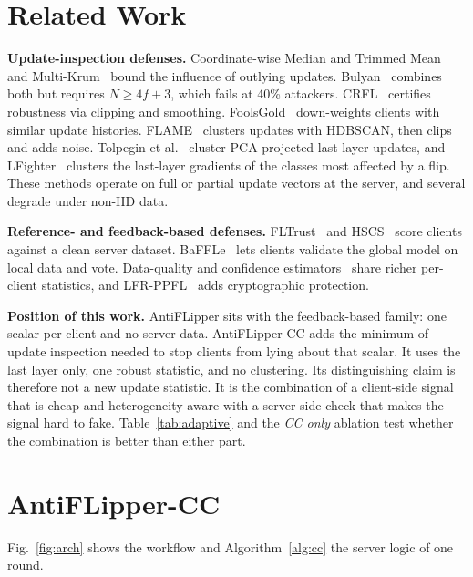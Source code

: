 \documentclass[conference]{IEEEtran}
\begin{document}
\section{Related Work}
\label{sec:related}
\textbf{Update-inspection defenses.} Coordinate-wise Median and Trimmed Mean~\cite{yin2018byzantine} and Multi-Krum~\cite{NIPS2017_f4b9ec30} bound the influence of outlying updates. Bulyan~\cite{mhamdi2018hidden} combines both but requires $N\ge 4f+3$, which fails at 40\% attackers. CRFL~\cite{xie2021crfl} certifies robustness via clipping and smoothing. FoolsGold~\cite{fung2020limitations} down-weights clients with similar update histories. FLAME~\cite{nguyen2022flame} clusters updates with HDBSCAN, then clips and adds noise. Tolpegin et al.~\cite{tolpegin2020data} cluster PCA-projected last-layer updates, and LFighter~\cite{jebreel2024lfighter} clusters the last-layer gradients of the classes most affected by a flip. These methods operate on full or partial update vectors at the server, and several degrade under non-IID data.

\textbf{Reference- and feedback-based defenses.} FLTrust~\cite{cao2020fltrust} and HSCS~\cite{li2023hscs} score clients against a clean server dataset. BaFFLe~\cite{andreina2021baffle} lets clients validate the global model on local data and vote. Data-quality and confidence estimators~\cite{jiang2023dataquality,ovi2023confident,li2025flgt,fedalign2026} share richer per-client statistics, and LFR-PPFL~\cite{shen2024lfrppfl} adds cryptographic protection.

\textbf{Position of this work.} AntiFLipper sits with the feedback-based family: one scalar per client and no server data. AntiFLipper-CC adds the minimum of update inspection needed to stop clients from lying about that scalar. It uses the last layer only, one robust statistic, and no clustering. Its distinguishing claim is therefore not a new update statistic. It is the combination of a client-side signal that is cheap and heterogeneity-aware with a server-side check that makes the signal hard to fake. Table~\ref{tab:adaptive} and the \emph{CC only} ablation test whether the combination is better than either part.

\section{AntiFLipper-CC}
\label{sec:design}
Fig.~\ref{fig:arch} shows the workflow and Algorithm~\ref{alg:cc} the server logic of one round.
\end{document}

